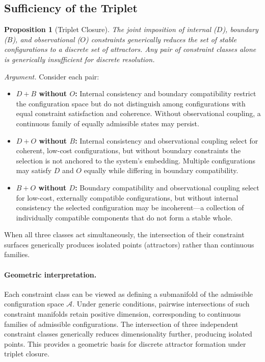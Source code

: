 \documentclass[12pt]{article}
\newtheorem{proposition}[theorem]{Proposition}
\begin{document}
\subsection{Sufficiency of the Triplet}

\begin{proposition}[Triplet Closure]\label{prop:triplet}
The joint imposition of internal ($D$), boundary ($B$), and observational ($O$) constraints generically reduces the set of stable configurations to a discrete set of attractors. Any pair of constraint classes alone is generically insufficient for discrete resolution.
\end{proposition}

\textit{Argument.} Consider each pair:
\begin{itemize}
    \item \textbf{$D + B$ without $O$:} Internal consistency and boundary compatibility restrict the configuration space but do not distinguish among configurations with equal constraint satisfaction and coherence. Without observational coupling, a continuous family of equally admissible states may persist.
    \item \textbf{$D + O$ without $B$:} Internal consistency and observational coupling select for coherent, low-cost configurations, but without boundary constraints the selection is not anchored to the system's embedding. Multiple configurations may satisfy $D$ and $O$ equally while differing in boundary compatibility.
    \item \textbf{$B + O$ without $D$:} Boundary compatibility and observational coupling select for low-cost, externally compatible configurations, but without internal consistency the selected configuration may be incoherent---a collection of individually compatible components that do not form a stable whole.
\end{itemize}

When all three classes act simultaneously, the intersection of their constraint surfaces generically produces isolated points (attractors) rather than continuous families.

\paragraph{Geometric interpretation.}
Each constraint class can be viewed as defining a submanifold of the admissible configuration space $\mathcal{A}$. Under generic conditions, pairwise intersections of such constraint manifolds retain positive dimension, corresponding to continuous families of admissible configurations. The intersection of three independent constraint classes generically reduces dimensionality further, producing isolated points. This provides a geometric basis for discrete attractor formation under triplet closure.
\end{document}
